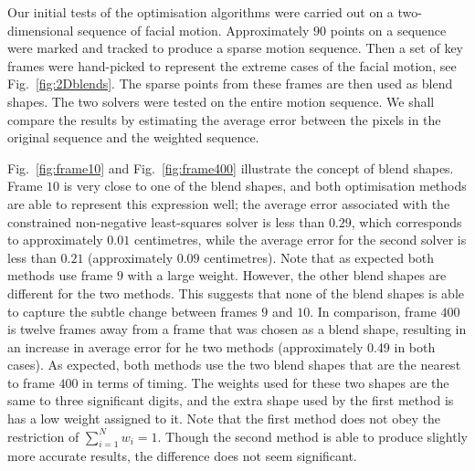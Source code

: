 \documentclass[11pt]{report}
\begin{document}
Our initial tests of the optimisation algorithms were carried out on a two-dimensional sequence of facial motion. Approximately $90$ points on a sequence were marked and tracked to produce a sparse motion sequence. Then a set of key frames were hand-picked to represent the extreme cases of the facial motion, see Fig.~\ref{fig:2Dblends}. The sparse points from these frames are then used as blend shapes. The two solvers were tested on the entire motion sequence. We shall compare the results by estimating the average error between the pixels in the original sequence and the weighted sequence.

Fig.~\ref{fig:frame10} and Fig.~\ref{fig:frame400} illustrate the concept of blend shapes. Frame $10$ is very close to one of the blend shapes, and both optimisation methods are able to represent this expression well; the average error associated with the constrained non-negative least-squares solver is less than $0.29$, which corresponds to approximately $0.01$ centimetres, while the average error for the second solver is less than $0.21$ (approximately $0.09$ centimetres). Note that as expected both methods use frame $9$ with a large weight. However, the other blend shapes are different for the two methods. This suggests that none of the blend shapes is able to capture the subtle change between frames $9$ and $10$. In comparison, frame $400$ is twelve frames away from a frame that was chosen as a blend shape, resulting in an increase in average error for he two methods (approximately 0.49 in both cases). As expected, both methods use the two blend shapes that are the nearest to frame $400$ in terms of timing. The weights used for these two shapes are the same to three significant digits, and the extra shape used by the first method is has a low weight assigned to it. Note that the first method does not obey the restriction of $\sum_{i=1}^N w_i = 1$. Though the second method is able to produce slightly more accurate results, the difference does not seem significant. 
\end{document}
